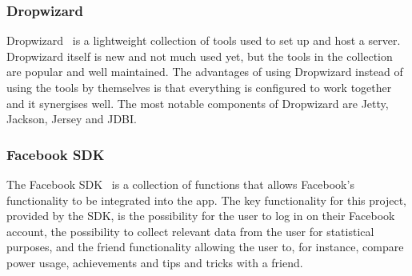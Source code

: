 \subsubsection{Dropwizard}
Dropwizard~\cite{dropwizard} is a lightweight collection of tools used to set up and host a server. Dropwizard itself is new and not much used yet, but the tools in the collection are popular and well maintained. 
The advantages of using Dropwizard instead of using the tools by themselves is that everything is configured to work together and it synergises well. The most notable components of Dropwizard are Jetty, Jackson, Jersey and JDBI.

\subsubsection{Facebook SDK}
The Facebook SDK~\cite{fsdk} is a collection of functions that allows Facebook's functionality to be integrated into the app. The key functionality for this project, 
provided by the SDK, is the possibility for the user to log in on their Facebook account, the possibility to collect relevant data from the user for statistical purposes, and the 
friend functionality allowing the user to, for instance, compare power usage, achievements and tips and tricks with a friend. 

